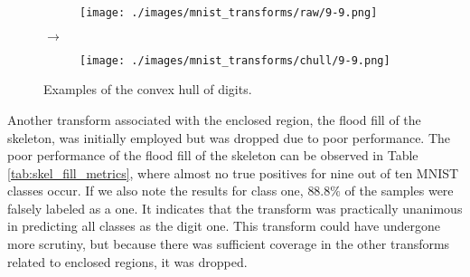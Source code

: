 \begin{figure}[H]
    \par\medskip

    \begin{subfigure}{.15\columnwidth}
        \centering
        \texttt{[image: ./images/mnist\_transforms/raw/9-9.png]}
        \caption{}
        \label{fig:chull_orig4}
    \end{subfigure}%
    $\rightarrow$
    \begin{subfigure}{.15\columnwidth}
        \centering
        \texttt{[image: ./images/mnist\_transforms/chull/9-9.png]}
        \caption{}
        \label{fig:chull_transform4}
    \end{subfigure}

    \caption{Examples of the convex hull of digits.}
    \label{fig:chull_examples}
\end{figure}

Another transform associated with the enclosed region, the flood fill of the
skeleton, was initially employed but was dropped due to poor performance. The
poor performance of the flood fill of the skeleton can be observed in Table
\ref{tab:skel_fill_metrics}, where almost no true positives for nine out of ten
MNIST classes occur.  If we also note the results for class one, $88.8\%$ of the
samples were falsely labeled as a one. It indicates that the transform was
practically unanimous in predicting all classes as the digit one. This transform
could have undergone more scrutiny, but because there was sufficient coverage in
the other transforms related to enclosed regions, it was dropped.

